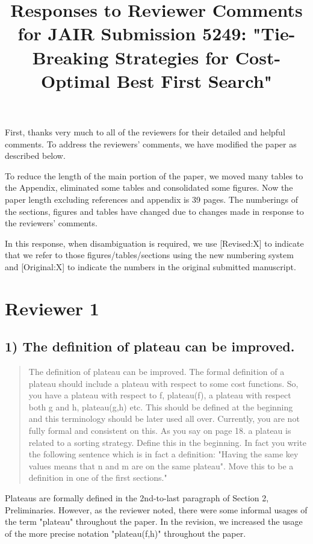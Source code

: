 \documentclass{article}
\date{}
\title{Responses to Reviewer Comments for JAIR Submission 5249: "Tie-Breaking Strategies for Cost-Optimal Best First Search"}
\begin{document}
\maketitle
First, thanks very much to all of the reviewers for their detailed and helpful comments.
To address the reviewers' comments, we have modified the paper as described below.

To reduce the length of the main portion of the paper, we moved many tables to the Appendix, 
eliminated some tables and consolidated some figures.
Now the paper length excluding references and appendix is 39 pages.
The numberings of the sections, figures and tables have changed due to changes made in response to the reviewers' comments.

In this response, when disambiguation is required, we use [Revised:X] to indicate that we refer to those figures/tables/sections using
the new numbering system and [Original:X] to indicate the numbers in the original submitted manuscript.

\section{Reviewer 1}
\label{sec:orgheadline13}

\subsection{1) The definition of plateau can be improved.}
\label{sec:orgheadline1}

\begin{quote}
The definition of plateau can be improved. The formal definition of
a plateau should include a plateau with respect to some cost
functions. So, you have a plateau with respect to f, plateau(f), a
plateau with respect both g and h, plateau(g,h) etc. This should be
defined at the beginning and this terminology should be later used all
over. Currently, you are not fully formal and consistent on this. As
you say on page 18. a plateau is related to a sorting strategy. Define
this in the beginning. In fact you write the following sentence which
is in fact a definition: "Having the same key values means that n and
m are on the same plateau". Move this to be a definition in one of the
first sections."
\end{quote}

Plateaus are formally defined in the 2nd-to-last paragraph of Section 2, Preliminaries.
However, as the reviewer noted, there were some informal usages of the term "plateau" throughout the paper.
In the revision, we increased the usage of the more precise notation "plateau(f,h)" throughout the paper.
\end{document}
